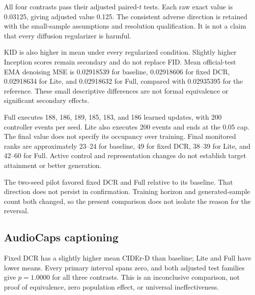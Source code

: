 \documentclass[10pt,a4paper,twocolumn]{article}
\begin{document}
All four contrasts pass their adjusted paired-$t$ tests.
Each raw exact value is 0.03125, giving adjusted value 0.125.
The consistent adverse direction is retained with the
small-sample assumptions and resolution qualification.
It is not a claim that every diffusion regularizer is harmful.

KID is also higher in mean under every regularized condition.
Slightly higher Inception scores remain secondary and do not
replace FID.
Mean official-test EMA denoising MSE is 0.02918539 for baseline,
0.02918606 for fixed DCR, 0.02918634 for Lite, and
0.02918632 for Full, compared with 0.02935395 for the reference.
These small descriptive differences are not formal
equivalence or significant secondary effects.

Full executes 188, 186, 189, 185, 183, and 186 learned
updates, with 200 controller events per seed.
Lite also executes 200 events and ends at the 0.05 cap.
The final value does not specify its occupancy over training.
Final monitored ranks are approximately 23--24 for baseline,
49 for fixed DCR, 38--39 for Lite, and 42--60 for Full.
Active control and representation changes do not establish
target attainment or better generation.

The two-seed pilot favored fixed DCR and Full relative to its
baseline. That direction does not persist in confirmation.
Training horizon and generated-sample count both changed,
so the present comparison does not isolate the reason
for the reversal.

\subsection{AudioCaps captioning}
\label{sec:audio_results}

Fixed DCR has a slightly higher mean CIDEr-D than baseline;
Lite and Full have lower means.
Every primary interval spans zero, and both adjusted test
families give $p=1.0000$ for all three contrasts.
This is an inconclusive comparison, not proof of equivalence,
zero population effect, or universal ineffectiveness.
\end{document}
